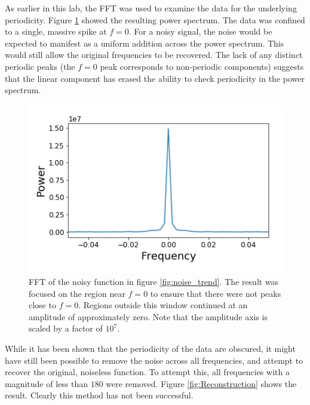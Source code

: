 \documentclass[twocolumn]{article}
\begin{document}
As earlier in this lab, the FFT was used to examine the data for the underlying periodicity. Figure \ref{fig:trend_fft} showed the resulting power spectrum. The data was confined to a single, massive spike at $f=0$. For a noisy signal, the noise would be expected to manifest as a uniform addition across the power spectrum. This would still allow the original frequencies to be recovered. The lack of any distinct periodic peaks (the $f=0$ peak corresponds to non-periodic components) suggests that the linear component has erased the ability to check periodicity in the power spectrum. 

\begin{figure}
\centering
\includegraphics[width=\linewidth]{trend_fft}
\caption{FFT of the noisy function in figure \ref{fig:noise_trend}. The result was focused on the region near $f=0$ to ensure that there were not peaks close to $f=0$. Regions outside this window continued at an amplitude of approximately zero. Note that the amplitude axis is scaled by a factor of $10^{7}$.}
\label{fig:trend_fft}
\end{figure}

While it has been shown that the periodicity of the data are obscured, it might have still been possible to remove the noise across all frequencies, and attempt to recover the original, noiseless function. To attempt this, all frequencies with a magnitude of less than $180$ were removed. Figure \ref{fig:Reconstruction} shows the result. Clearly this method has not been successful. 
\end{document}
